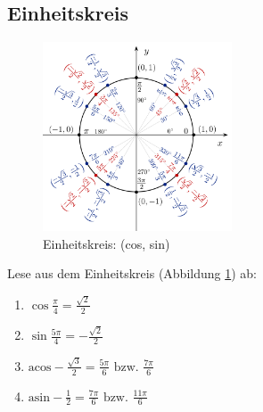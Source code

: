 \documentclass[11pt, a4paper]{article}
\newcommand{\acos}{\mathrm{acos}}
\newcommand{\asin}{\mathrm{asin}}
\begin{document}
\subsection{Einheitskreis}
\begin{figure}[h!]
	\centering
	\includegraphics[width=0.5\textwidth]{Einheitskreis.png}
	\caption{Einheitskreis: (cos, sin)}
	\label{einheitskreis}
\end{figure}
Lese aus dem Einheitskreis (Abbildung \ref{einheitskreis}) ab:
\begin{enumerate}
	\item $\cos \frac{\pi}{4} = \frac{\sqrt{2}}{2}$
	\item $\sin \frac{5\pi}{4} = -\frac{\sqrt{2}}{2}$
	\item $\acos -\frac{\sqrt{3}}{2} = \frac{5\pi}{6} \text{ bzw. } \frac{7\pi}{6}$
	\item $\asin -\frac{1}{2} = \frac{7\pi}{6} \text{ bzw. } \frac{11\pi}{6}$
\end{enumerate}
\end{document}
